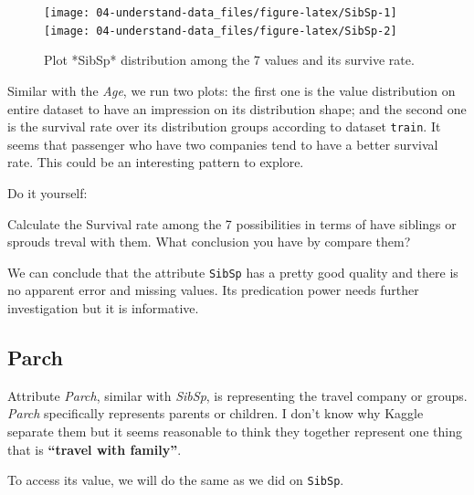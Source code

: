 \documentclass[
]{book}
\makeatletter
\newenvironment{Shaded}{\begin{snugshade}}{\end{snugshade}}
\newcommand{\CommentTok}[1]{\textcolor[rgb]{0.56,0.35,0.01}{\textit{#1}}}
\newcommand{\KeywordTok}[1]{\textcolor[rgb]{0.13,0.29,0.53}{\textbf{#1}}}
\newcommand{\NormalTok}[1]{#1}
\newcommand{\OperatorTok}[1]{\textcolor[rgb]{0.81,0.36,0.00}{\textbf{#1}}}
\newenvironment{kframe}{%
\medskip{}
\setlength{\fboxsep}{.8em}
 \def\at@end@of@kframe{}%
 \ifinner\ifhmode%
  \def\at@end@of@kframe{\end{minipage}}%
  \begin{minipage}{\columnwidth}%
 \fi\fi%
 \def\FrameCommand##1{\hskip\@totalleftmargin \hskip-\fboxsep
 \colorbox{shadecolor}{##1}\hskip-\fboxsep
     \hskip-\linewidth \hskip-\@totalleftmargin \hskip\columnwidth}%
 \MakeFramed {\advance\hsize-\width
   \@totalleftmargin\z@ \linewidth\hsize
   \@setminipage}}%
 {\par\unskip\endMakeFramed%
 \at@end@of@kframe}
\newenvironment{rmdblock}[1]
  {
  \begin{itemize}
  \renewcommand{\labelitemi}{
    \raisebox{-.7\height}[0pt][0pt]{
      {\setkeys{Gin}{width=3em,keepaspectratio}\texttt{[image: images/\#1]}}
    }
  }
  \setlength{\fboxsep}{1em}
  \begin{kframe}
  \item
  }
  {
  \end{kframe}
  \end{itemize}
  }
\newenvironment{rmdaction}
  {\begin{rmdblock}{action}}
  {\end{rmdblock}}
\makeatother
\begin{document}
\begin{figure}

{\centering \texttt{[image: 04-understand-data\_files/figure-latex/SibSp-1]} \texttt{[image: 04-understand-data\_files/figure-latex/SibSp-2]} 

}

\caption{Plot *SibSp* distribution among the 7 values and its survive rate.}\label{fig:SibSp}
\end{figure}

Similar with the \emph{Age}, we run two plots: the first one is the value distribution on entire dataset to have an impression on its distribution shape; and the second one is the survival rate over its distribution groups according to dataset \texttt{train}. It seems that passenger who have two companies tend to have a better survival rate. This could be an interesting pattern to explore.

\begin{rmdaction}
Do it yourself:

Calculate the Survival rate among the 7 possibilities in terms of have siblings or sprouds treval with them. What conclusion you have by compare them?
\end{rmdaction}

We can conclude that the attribute \texttt{SibSp} has a pretty good quality and there is no apparent error and missing values. Its predication power needs further investigation but it is informative.

\hypertarget{parch}{%
\subsection*{Parch}\label{parch}}


Attribute \emph{Parch}, similar with \emph{SibSp}, is representing the travel company or groups. \emph{Parch} specifically represents parents or children. I don't know why Kaggle separate them but it seems reasonable to think they together represent one thing that is \textbf{``travel with family''}.

To access its value, we will do the same as we did on \texttt{SibSp}.

\begin{Shaded}
\end{Shaded}
\end{document}
